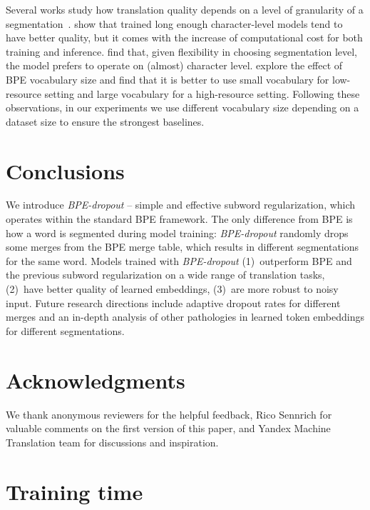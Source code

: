 \documentclass[11pt,a4paper]{article}
\begin{document}
Several works study how translation quality depends on a level of granularity of a segmentation~\cite{revisiting, char_preferred, lowresBPE}. 
\citet{revisiting} show that trained long enough character-level models tend to have better quality, but it comes with the increase of computational cost for both training and inference. \citet{char_preferred} find that, given flexibility in choosing segmentation level, the model prefers to operate on (almost) character level. \citet{lowresBPE} explore the effect of BPE vocabulary size and find that it is better to use small vocabulary for low-resource setting and large vocabulary for a high-resource setting. Following these observations, in our experiments we use different vocabulary size depending on a dataset size to ensure the strongest baselines.

 
\section{Conclusions} 

We introduce \textit{BPE-dropout} -- simple and effective subword regularization, which operates within the standard BPE framework. The only difference from BPE is how a word is segmented during model training: \textit{BPE-dropout} randomly drops some merges from the BPE merge table, which results in different segmentations for the same word. Models trained with \textit{BPE-dropout} (1)~outperform BPE and the previous subword regularization on a wide range of translation tasks, (2)~have better quality of learned embeddings, (3)~are more robust to noisy input. Future research directions include adaptive dropout rates for different merges and an in-depth analysis of other pathologies in learned token embeddings for different segmentations.


\section*{Acknowledgments} 
We thank anonymous reviewers for the helpful feedback, Rico Sennrich for valuable comments on the first version of this paper, and Yandex Machine Translation team for  discussions and inspiration.




\appendix


\section{Training time}
\end{document}
